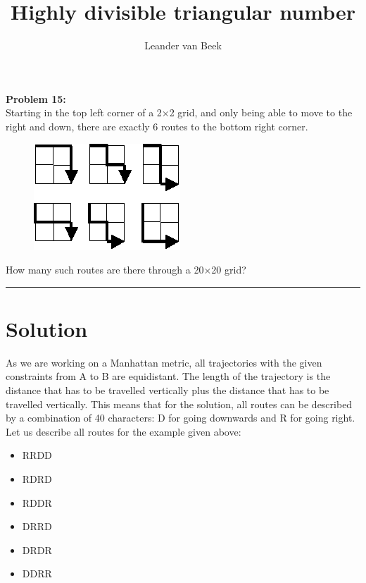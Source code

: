 \documentclass[10pt,a4paper]{article}
\author{Leander van Beek}
\title{Highly divisible triangular number}
\begin{document}
\maketitle

\textbf{Problem 15:} \\
Starting in the top left corner of a 2×2 grid, and only being able to move to the right and down, there are exactly 6 routes to the bottom right corner.\\

\begin{figure}[h]
	\centering
	\includegraphics[width=0.4\linewidth]{problem.png}
\end{figure}

How many such routes are there through a 20×20 grid?

\vspace{0.5cm}
\hrule
\vspace{0.5cm}

\section{Solution}

As we are working on a Manhattan metric, all trajectories with the given constraints from A to B are equidistant. The length of the trajectory is the distance that has to be travelled vertically plus the distance that has to be travelled vertically. This means that for the solution, all routes can be described by a combination of 40 characters: D for going downwards and R for going right. Let us describe all routes for the example given above:

\begin{itemize}
	\itemsep0em
	\item RRDD
	\item RDRD
	\item RDDR
	\item DRRD
	\item DRDR
	\item DDRR
\end{itemize}
\end{document}
